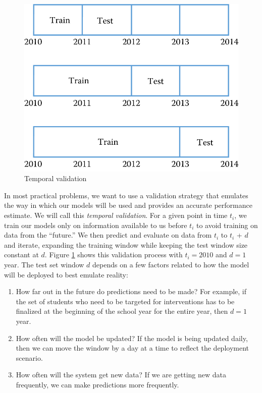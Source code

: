 \documentclass[]{krantz}
\begin{document}
\begin{figure}

{\centering \includegraphics[width=0.7\linewidth]{ChapterML/figures/temporal} 

}

\caption{Temporal validation}\label{fig:temporal}
\end{figure}

In most practical problems, we want to use a validation strategy that
emulates the way in which our models will be used and provides an
accurate performance estimate. We will call this \emph{temporal
validation}. For a given point in time \(t_i\), we train our models only
on information available to us before \(t_i\) to avoid training on data
from the ``future.'' We then predict and evaluate on data from \(t_i\)
to \(t_i\) + \(d\) and iterate, expanding the training window while
keeping the test window size constant at \(d\). Figure
\ref{fig:temporal} shows this validation process with \(t_i=2010\) and
\(d=1\) year. The test set window \(d\) depends on a few factors related
to how the model will be deployed to best emulate reality:

\begin{enumerate}
\def\labelenumi{\arabic{enumi}.}
\item
  How far out in the future do predictions need to be made? For example,
  if the set of students who need to be targeted for interventions has
  to be finalized at the beginning of the school year for the entire
  year, then \(d = 1\) year.
\item
  How often will the model be updated? If the model is being updated
  daily, then we can move the window by a day at a time to reflect the
  deployment scenario.
\item
  How often will the system get new data? If we are getting new data
  frequently, we can make predictions more frequently.
\end{enumerate}
\end{document}
